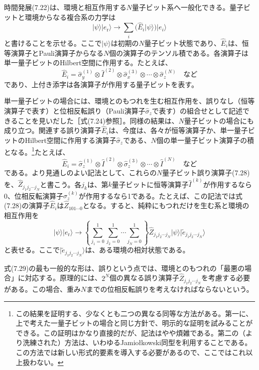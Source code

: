 \hypertarget{srcpage:310}{}\label{srcpage:310}
時間発展(7.22)は、環境と相互作用する$N$量子ビット系へ一般化できる。量子ビットと環境からなる複合系の力学は
\begin{equation}|\psi\rangle|e_{\mathrm r}\rangle\longrightarrow\sum_i(\hat E_i|\psi\rangle)|e_i\rangle\tag{7.26}\end{equation}
と書けることを示せる。ここで$|\psi\rangle$は初期の$N$量子ビット状態であり、$\hat E_i$は、恒等演算子とPauli演算子からなる$N$個の演算子のテンソル積である。各演算子は単一量子ビットのHilbert空間に作用する。たとえば、
\begin{equation}\hat E_i=\hat\sigma_y^{(1)}\otimes\hat I^{(2)}\otimes\hat\sigma_x^{(3)}\otimes\cdots\otimes\hat\sigma_z^{(N)}\quad\text{など}\tag{7.27}\end{equation}
であり、上付き添字は各演算子が作用する量子ビットを表す。

単一量子ビットの場合には、環境とのもつれを生む相互作用を、誤りなし（恒等演算子で表す）と位相反転誤り（Pauli演算子$\hat\sigma_z$で表す）の組合せとして記述できることを見いだした［式(7.24)参照］。同様の結果は、$N$量子ビットの場合にも成り立つ。関連する誤り演算子$\hat E_i$は、今度は、各々が恒等演算子か、単一量子ビットのHilbert空間に作用する演算子$\hat\sigma_z$である、$N$個の単一量子ビット演算子の積となる。\footnote{この結果を証明する、少なくとも二つの異なる同等な方法がある。第一に、上で考えた一量子ビットの場合と同じ方針で、明示的な証明を試みることができる。この証明はかなり直接的だが、記法はやや煩雑である。第二の（より洗練された）方法は、いわゆるJamiołkowski同型\cite{ref359}を利用することである。この方法では新しい形式的要素を導入する必要があるので、ここではこれ以上扱わない。}たとえば、
\begin{equation}\hat E_i=\hat\sigma_z^{(1)}\otimes\hat I^{(2)}\otimes\hat\sigma_z^{(3)}\otimes\cdots\otimes\hat I^{(N)}\quad\text{など}\tag{7.28}\end{equation}
である。より見通しのよい記法として、これらの$N$量子ビット誤り演算子(7.28)を、$\hat Z_{j_1j_2\cdots j_N}$と書こう。各$j_k$は、第$k$量子ビットに恒等演算子$\hat I^{(k)}$が作用するなら0、位相反転演算子$\hat\sigma_z^{(k)}$が作用するなら1である。たとえば、この記法では式(7.28)の演算子$\hat E_i$は$\hat Z_{101\cdots0}$となる。すると、純粋にもつれだけを生む系と環境の相互作用を
\begin{equation}|\psi\rangle|e_{\mathrm r}\rangle\longrightarrow\left\{\sum_{j_1=0}^{1}\sum_{j_2=0}^{1}\cdots\sum_{j_N=0}^{1}\right\}\hat Z_{j_1j_2\cdots j_N}|\psi\rangle|\widetilde e_{j_1j_2\cdots j_N}\rangle\tag{7.29}\end{equation}
と表せる。ここで$|\widetilde e_{j_1j_2\cdots j_N}\rangle$は、ある環境の相対状態である。

式(7.29)の最も一般的な形は、誤りという点では、環境とのもつれの「最悪の場合」に対応する。原理的には、$2^N$個の異なる誤り演算子$\hat Z_{j_1j_2\cdots j_N}$を考慮する必要がある。この場合、重み$N$までの位相反転誤りを考えなければならないという。
